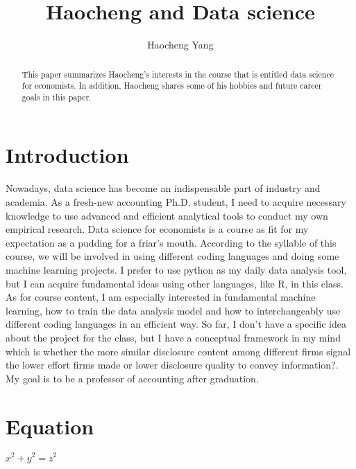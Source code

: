 \documentclass{article}
\title{Haocheng and Data science}
\author{Haocheng Yang}
\begin{document}
\maketitle

\begin{abstract}
This paper summarizes Haocheng's interests in the course that is entitled data science for economists. In addition, Haocheng shares some of his hobbies and future career goals in this paper.
\end{abstract}

\section{Introduction}

Nowadays, data science has become an indispensable part of industry and academia. As a fresh-new accounting Ph.D. student, I need to acquire necessary knowledge to use advanced and efficient analytical tools to conduct my own empirical research. Data science for economists is a course as fit for my expectation as a pudding for a friar's mouth. According to the syllable of this course, we will be involved in using different coding languages and doing some machine learning projects. I prefer to use python as my daily data analysis tool, but I can acquire fundamental ideas using other languages, like R, in this class. As for course content, I am especially interested in fundamental machine learning, how to train the data analysis model and how to interchangeably use different coding languages in an efficient way. So far, I don't have a specific idea about the project for the class, but I have a conceptual framework in my mind which is whether the more similar disclosure content among different firms signal the lower effort firms made or lower disclosure quality to convey information?. My goal is to be a professor of accounting after graduation.

\section{Equation}
\(x^2 + y^2 = z^2\)
\end{document}
